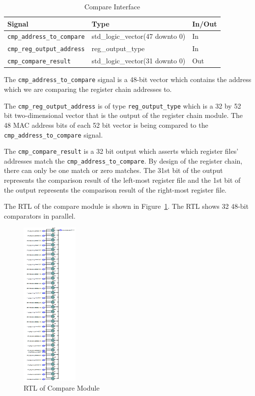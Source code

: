 \documentclass{article}
\begin{document}
\begin{table}[ht]
    \begin{center}
        \begin{tabular}{lll}\hline
        Signal & Type & In/Out \\
        \hline
        \texttt{cmp\_address\_to\_compare} & std\_logic\_vector(47 downto 0) & In \\
        \hline
        \texttt{cmp\_reg\_output\_address} & reg\_output\_type & In \\
        \hline
        \texttt{cmp\_compare\_result} & std\_logic\_vector(31 downto 0) & Out \\
        \hline
        \end{tabular}
        \caption{Compare Interface}\label{tab:compare}
    \end{center}
\end{table}

The \texttt{cmp\_address\_to\_compare} signal is a 48-bit vector which contains the address which we are comparing the register chain addresses to. 

The \texttt{cmp\_reg\_output\_address} is of type \texttt{reg\_output\_type} which is a 32 by 52 bit two-dimensional vector that is the output of the register chain module. The 48 MAC address bits of each 52 bit vector is being compared to the \texttt{cmp\_address\_to\_compare} signal. 

The \texttt{cmp\_compare\_result} is a 32 bit output which asserts which register files' addresses match the \texttt{cmp\_address\_to\_compare}. By design of the register chain, there can only be one match or zero matches. The 31st bit of the output represents the comparison result of the left-most register file and the 1st bit of the output represents the comparison result of the right-most register file.

The RTL of the compare module is shown in Figure~\ref{fig:compare-rtl}. The RTL shows 32 48-bit comparators in parallel.

\begin{figure}[ht!]
  \centering
  	\includegraphics[width=0.25\textwidth]{compare_rtl.PNG}
  \caption{RTL of Compare Module}
  \label{fig:compare-rtl}
\end{figure}
\end{document}
